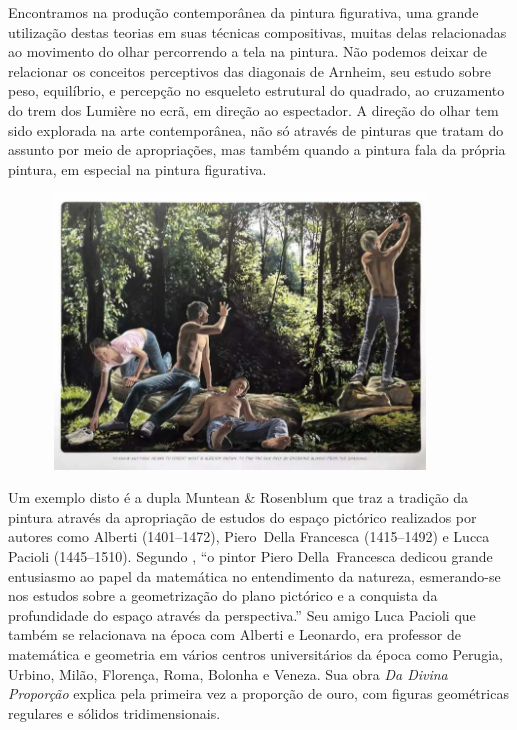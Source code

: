 Encontramos na produção contemporânea da pintura figurativa, uma grande
utilização destas teorias em suas técnicas compositivas, muitas delas
relacionadas ao movimento do olhar percorrendo a tela na pintura. Não
podemos deixar de relacionar os conceitos perceptivos das diagonais de
Arnheim, seu estudo sobre peso, equilíbrio, e percepção no esqueleto
estrutural do quadrado, ao cruzamento do trem dos Lumière no ecrã, em
direção ao espectador. A direção do olhar tem sido explorada na arte
contemporânea, não só através de pinturas que tratam do assunto por
meio de apropriações, mas também quando a pintura fala da própria
pintura, em especial na pintura figurativa.

\begin{figure}
	\caption{}

	\includegraphics[width=4in,height=2.87832in]{figuras/muntean-rosenblum-to-know-anything-2010.pdf.compressed.pdf}
\end{figure}

Um exemplo disto é a dupla Muntean \& Rosenblum que traz a tradição da
pintura através da apropriação de estudos do espaço pictórico
realizados por autores como Alberti (1401--1472), Piero~Della Francesca
(1415--1492) e Lucca Pacioli (1445--1510). Segundo
\textcite[34]{sabino2000pintura}, \enquote{o pintor Piero Della~Francesca
  dedicou grande entusiasmo ao papel da matemática no
	entendimento da natureza, esmerando-se nos estudos sobre a
	geometrização do plano pictórico e a conquista da profundidade do
	espaço através da perspectiva.} Seu amigo Luca Pacioli que também se
relacionava na época com Alberti e Leonardo, era professor de
matemática e geometria em vários centros universitários da época como
Perugia, Urbino, Milão, Florença, Roma, Bolonha e Veneza. Sua obra
\emph{Da Divina Proporção} explica pela primeira vez a proporção de
ouro, com figuras geométricas regulares e sólidos tridimensionais. \parencite{sabino2000pintura}


